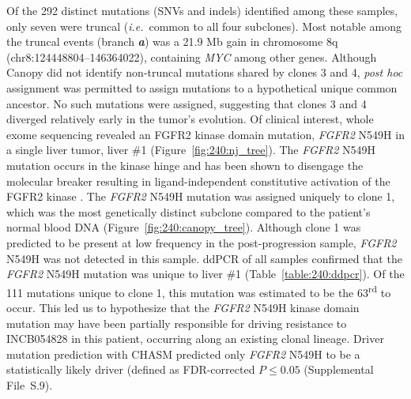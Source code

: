 Of the 292 distinct mutations (SNVs and indels) identified among these samples, only seven were truncal (\textit{i.e.}\ common to all four subclones). Most notable among the truncal events (branch \textbf{\textit{a}}) was a 21.9 Mb gain in chromosome 8q (chr8:124448804--146364022), containing \textit{MYC} among other genes. Although Canopy did not identify non-truncal mutations shared by clones 3 and 4, \textit{post hoc} assignment was permitted to assign mutations to a hypothetical unique common ancestor. No such mutations were assigned, suggesting that clones 3 and 4 diverged relatively early in the tumor's evolution. Of clinical interest, whole exome sequencing revealed an FGFR2 kinase domain mutation, \textit{FGFR2} N549H in a single liver tumor, liver \#1 (Figure~\ref{fig:240:nj_tree}). The \textit{FGFR2} N549H mutation occurs in the kinase hinge and has been shown to disengage the molecular breaker resulting in ligand-independent constitutive activation of the FGFR2 kinase \cite{chen2007}. The \textit{FGFR2} N549H mutation was assigned uniquely to clone 1, which was the most genetically distinct subclone compared to the patient's normal blood DNA (Figure~\ref{fig:240:canopy_tree}). Although clone 1 was predicted to be present at low frequency in the post-progression sample, \textit{FGFR2} N549H was not detected in this sample. ddPCR of all samples confirmed that the \textit{FGFR2} N549H mutation was unique to liver \#1 (Table~\ref{table:240:ddpcr}). Of the 111 mutations unique to clone 1, this mutation was estimated to be the 63\textsuperscript{rd} to occur. This led us to hypothesize that the \textit{FGFR2} N549H kinase domain mutation may have been partially responsible for driving resistance to INCB054828 in this patient, occurring along an existing clonal lineage. Driver mutation prediction with CHASM \cite{carter2009} predicted only \textit{FGFR2} N549H to be a statistically likely driver (defined as FDR-corrected $P \le 0.05$ (Supplemental File~S\thechapter{}.9).

